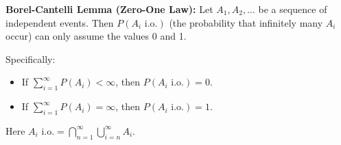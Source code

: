 \textbf{Borel-Cantelli Lemma (Zero-One Law):} Let $A_1, A_2, \ldots$ be a sequence of independent events. Then $P(A_i \text{ i.o.})$ (the probability that infinitely many $A_i$ occur) can only assume the values 0 and 1.

Specifically:
\begin{itemize}
\item If $\sum_{i=1}^{\infty} P(A_i) < \infty$, then $P(A_i \text{ i.o.}) = 0$.
\item If $\sum_{i=1}^{\infty} P(A_i) = \infty$, then $P(A_i \text{ i.o.}) = 1$.
\end{itemize}

Here $A_i \text{ i.o.} = \bigcap_{n=1}^{\infty} \bigcup_{i=n}^{\infty} A_i$.
